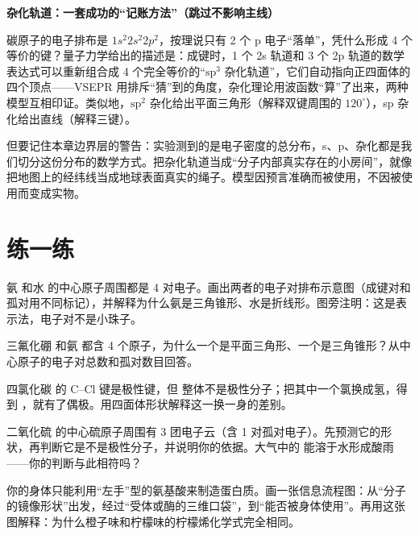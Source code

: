 \begin{tiaozhan}
\textbf{杂化轨道：一套成功的“记账方法”（跳过不影响主线）}

碳原子的电子排布是 $1s^2 2s^2 2p^2$，按理说只有 2 个 p 电子“落单”，凭什么形成 4 个等价的键？量子力学给出的描述是：成键时，1 个 2s 轨道和 3 个 2p 轨道的数学表达式可以重新组合成 4 个完全等价的“$\mathrm{sp^3}$ 杂化轨道”，它们自动指向正四面体的四个顶点——VSEPR 用排斥“猜”到的角度，杂化理论用波函数“算”了出来，两种模型互相印证。类似地，$\mathrm{sp^2}$ 杂化给出平面三角形（解释双键周围的 $120^{\circ}$），sp 杂化给出直线（解释三键）。

但要记住本章边界层的警告：实验测到的是电子密度的总分布，s、p、杂化都是我们切分这份分布的数学方式。把杂化轨道当成“分子内部真实存在的小房间”，就像把地图上的经纬线当成地球表面真实的绳子。模型因预言准确而被使用，不因被使用而变成实物。
\end{tiaozhan}

\section*{练一练}

\begin{sikaoti}
\item 氨  和水  的中心原子周围都是 4 对电子。画出两者的电子对排布示意图（成键对和孤对用不同标记），并解释为什么氨是三角锥形、水是折线形。图旁注明：这是表示法，电子对不是小珠子。
\item 三氟化硼  和氨  都含 4 个原子，为什么一个是平面三角形、一个是三角锥形？从中心原子的电子对总数和孤对数目回答。
\item 四氯化碳  的 C–Cl 键是极性键，但  整体不是极性分子；把其中一个氯换成氢，得到 ，就有了偶极。用四面体形状解释这一换一身的差别。
\item 二氧化硫  的中心硫原子周围有 3 团电子云（含 1 对孤对电子）。先预测它的形状，再判断它是不是极性分子，并说明你的依据。大气中的  能溶于水形成酸雨——你的判断与此相符吗？
\item 你的身体只能利用“左手”型的氨基酸来制造蛋白质。画一张信息流程图：从“分子的镜像形状”出发，经过“受体或酶的三维口袋”，到“能否被身体使用”。再用这张图解释：为什么橙子味和柠檬味的柠檬烯化学式完全相同。
\end{sikaoti}
